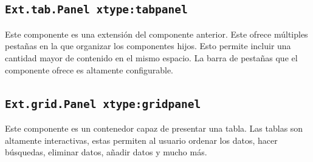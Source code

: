 	\subsection{\texttt{Ext.tab.Panel xtype:tabpanel}}
		Este componente es una extensión del componente anterior. Este ofrece múltiples pestañas en la que organizar los componentes hijos.
		Esto permite incluir una cantidad mayor de contenido en el mismo espacio. La barra de pestañas que el componente ofrece es altamente
		configurable. 
	\subsection{\texttt{Ext.grid.Panel xtype:gridpanel}}
		Este componente es un contenedor capaz de presentar una tabla. Las tablas son altamente interactivas, estas permiten al usuario
		ordenar los datos, hacer búsquedas, eliminar datos, añadir datos y mucho más.

